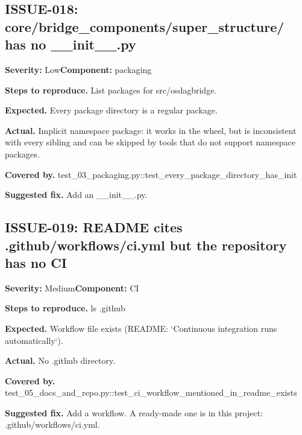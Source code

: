\subsection*{ISSUE-018: core/\allowbreak{}bridge\_\allowbreak{}components/\allowbreak{}super\_\allowbreak{}structure/\allowbreak{} has no \_\allowbreak{}\_\allowbreak{}init\_\allowbreak{}\_\allowbreak{}.\allowbreak{}py}
\textbf{Severity:} Low\quad \textbf{Component:} packaging\par
\textbf{Steps to reproduce.} List packages for src/\allowbreak{}osdagbridge.\allowbreak{}\par
\textbf{Expected.} Every package directory is a regular package.\allowbreak{}\par
\textbf{Actual.} Implicit namespace package: it works in the wheel, but is inconsistent with every sibling and can be skipped by tools that do not support namespace packages.\allowbreak{}\par
\textbf{Covered by.} test\_\allowbreak{}03\_\allowbreak{}packaging.\allowbreak{}py::\allowbreak{}test\_\allowbreak{}every\_\allowbreak{}package\_\allowbreak{}directory\_\allowbreak{}has\_\allowbreak{}init\par
\textbf{Suggested fix.} Add an \_\allowbreak{}\_\allowbreak{}init\_\allowbreak{}\_\allowbreak{}.\allowbreak{}py.\allowbreak{}

\subsection*{ISSUE-019: README cites .\allowbreak{}github/\allowbreak{}workflows/\allowbreak{}ci.\allowbreak{}yml but the repository has no CI}
\textbf{Severity:} Medium\quad \textbf{Component:} CI\par
\textbf{Steps to reproduce.} ls .\allowbreak{}github\par
\textbf{Expected.} Workflow file exists (README: `Continuous integration runs automatically`).\allowbreak{}\par
\textbf{Actual.} No .\allowbreak{}github directory.\allowbreak{}\par
\textbf{Covered by.} test\_\allowbreak{}05\_\allowbreak{}docs\_\allowbreak{}and\_\allowbreak{}repo.\allowbreak{}py::\allowbreak{}test\_\allowbreak{}ci\_\allowbreak{}workflow\_\allowbreak{}mentioned\_\allowbreak{}in\_\allowbreak{}readme\_\allowbreak{}exists\par
\textbf{Suggested fix.} Add a workflow.\allowbreak{} A ready-made one is in this project: .\allowbreak{}github/\allowbreak{}workflows/\allowbreak{}ci.\allowbreak{}yml.\allowbreak{}

